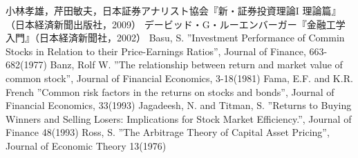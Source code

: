 ﻿\documentclass[11pt]{jreport}
\begin{document}
\begin{thebibliography}{30}
	 小林孝雄，芹田敏夫，日本証券アナリスト協会『新・証券投資理論I 理論篇』（日本経済新聞出版社，2009）
	 デービッド・G・ルーエンバーガー『金融工学入門』（日本経済新聞社，2002）
	 Basu, S. ''Investment Performance of Commin Stocks in Relation to their Price-Earnings Ratios'', Journal of Finance, 663-682(1977)
	 Banz, Rolf W. ''The relationship between return and market value of common stock'', Journal of Financial Economics, 3-18(1981)
	 Fama, E.F. and K.R. French ''Common risk factors in the returns on stocks and bonds'', Journal of Financial Economics, 33(1993)
	 Jagadeesh, N. and Titman, S. ''Returns to Buying Winners and Selling Losers: Implications for Stock Market Efficiency.'', Journal of Finance 48(1993)
	 Ross, S. ''The Arbitrage Theory of Capital Asset Pricing'', Journal of Economic Theory 13(1976)
	
\end{thebibliography}
\end{document}
